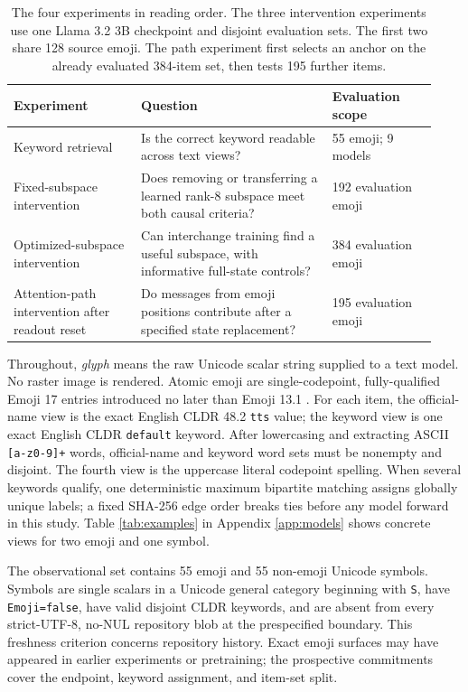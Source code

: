 \documentclass{article}
\begin{document}
\begin{table}[t]
\centering
\small
\setlength{\tabcolsep}{4pt}
\begin{tabular}{p{0.28\linewidth}p{0.42\linewidth}p{0.23\linewidth}}
\toprule
Experiment & Question & Evaluation scope \\
\midrule
Keyword retrieval & Is the correct keyword readable across text views? & 55 emoji; 9 models \\
Fixed-subspace intervention & Does removing or transferring a learned rank-8 subspace meet both causal criteria? & 192 evaluation emoji \\
Optimized-subspace intervention & Can interchange training find a useful subspace, with informative full-state controls? & 384 evaluation emoji \\
Attention-path intervention after readout reset & Do messages from emoji positions contribute after a specified state replacement? & 195 evaluation emoji \\
\bottomrule
\end{tabular}
\caption{The four experiments in reading order. The three intervention
experiments use one Llama 3.2 3B checkpoint and disjoint evaluation sets.
The first two share 128 source emoji. The path experiment first selects an
anchor on the already evaluated 384-item set, then tests 195 further items.}
\label{tab:study-guide}
\end{table}

Throughout, \emph{glyph} means the raw Unicode scalar string supplied to a
text model. No raster image is rendered. Atomic emoji are single-codepoint,
fully-qualified Emoji 17 entries introduced no later than Emoji 13.1
\citep{unicode2025emoji}. For each item, the official-name view is the exact
English CLDR 48.2 \texttt{tts} value; the keyword view is one exact English
CLDR \texttt{default} keyword. After lowercasing and extracting ASCII
\texttt{[a-z0-9]+} words, official-name and keyword word sets must be nonempty
and disjoint. The fourth view is the uppercase literal codepoint spelling.
When several keywords qualify, one deterministic maximum bipartite matching
assigns globally unique labels; a fixed SHA-256 edge order breaks ties before
any model forward in this study. Table \ref{tab:examples} in Appendix \ref{app:models}
shows concrete views for two emoji and one symbol.

The observational set contains 55 emoji and 55 non-emoji Unicode symbols.
Symbols are single scalars in a Unicode general category beginning with
\texttt{S}, have \texttt{Emoji=false}, have valid disjoint CLDR keywords, and
are absent from every strict-UTF-8, no-NUL repository blob at the prespecified
boundary. This freshness criterion concerns repository history. Exact emoji
surfaces may have appeared in earlier experiments or pretraining; the
prospective commitments cover the endpoint, keyword assignment, and item-set split.
\end{document}
